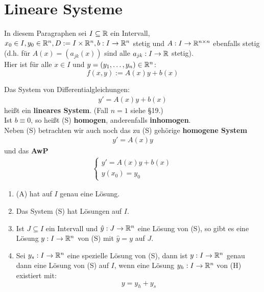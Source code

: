 \documentclass[a4paper,twoside,DIV15,BCOR12mm,chapterprefix=true,headings=twolinechapter]{scrbook}
\begin{document}
\chapter{Lineare Systeme}
In diesem Paragraphen sei $I\subseteq\mathbb{R}$ ein Intervall, $x_0\in I, y_0\in\mathbb{R}^n,
D:=I\times\mathbb{R}^n,b:I\to\mathbb{R}^n$ stetig und $A:I\to\mathbb{R}^{n\times n}$ ebenfalls stetig 
(d.h. für $A(x)=(a_{jk}(x))$ sind alle $a_{jk}:I\to\mathbb{R}$ stetig).\\
Hier ist für alle $x\in I$ und $y=(y_1,\ldots,y_n)\in\mathbb{R}^n$:
\[f(x,y):=A(x)y+b(x)\]

\begin{definition}
Das System von Differentialgleichungen:
\begin{align*}
y'=A(x)y+b(x)\tag{S}
\end{align*}
heißt ein \textbf{lineares System}. (Fall $n=1$ siehe §19.)\\
Ist $b\equiv 0$, so heißt (S) \textbf{homogen}, anderenfalls \textbf{inhomogen}.\\
Neben (S) betrachten wir auch noch das zu (S) gehörige \textbf{homogene System}
\begin{align*}
y'=A(x)y\tag{H}
\end{align*}
und das \textbf{AwP}
\begin{align*}
\tag{A}
\begin{cases}
y'=A(x)y+b(x)\\
y(x_0)=y_0
\end{cases}
\end{align*}
\end{definition}

\begin{satz}
\begin{enumerate}
\item (A) hat auf $I$ genau eine Lösung.
\item Das System (S) hat Lösungen auf $I$.
\item Ist $J\subseteq I$ ein Intervall und $\hat y:J\to\mathbb{R}^n$ eine Lösung von (S),
so gibt es eine Lösung $y:I\to\mathbb{R}^n$ von (S) mit $\hat y=y$ auf $J$.
\item Sei $y_s:I\to\mathbb{R}^n$ eine spezielle Lösung von (S), dann ist $y:I\to\mathbb{R}^n$ genau dann eine
Lösung von (S) auf $I$, wenn eine Lösung $y_h:I\to\mathbb{R}^n$ von (H) existiert mit:
\[y=y_h+y_s\]
\end{enumerate}
\end{satz}
\end{document}
